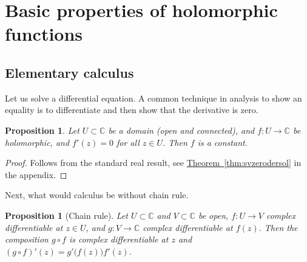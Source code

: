 \documentclass[12pt,openany]{book}
\newcommand{\C}{{\mathbb{C}}}
\theoremstyle{plain}
\newtheorem{prop}[thm]{Proposition}
\theoremstyle{remark}
\theoremstyle{definition}
\theoremstyle{exercise}
\theoremstyle{example}
\newcommand{\thmref}[1]{\hyperref[#1]{Theorem~\ref*{#1}}}
\begin{document}

\section{Basic properties of holomorphic functions}

\subsection{Elementary calculus}

Let us solve a differential equation.  A common technique in analysis
to show an equality is to differentiate and then show that the derivative is
zero.

\begin{prop} \label{prop:zeroder}
Let $U \subset \C$ be a domain (open and connected),
and $f \colon U \to \C$ be holomorphic, and $f'(z) = 0$ for all $z \in U$.
Then $f$ is a constant.
\end{prop}

\begin{proof}
Follows from the standard real result,
see \thmref{thm:svzerodersol} in the appendix.
\end{proof}

Next, what would calculus be without chain rule.

\begin{prop}[Chain rule] 
Let $U \subset \C$ and $V \subset \C$ be open, $f \colon U \to V$
complex differentiable at $z \in U$, and $g \colon V \to \C$ complex differentiable
at $f(z)$.  Then the composition $g \circ f$
is complex differentiable at $z$ and $(g \circ f)'(z) = g'\bigl(f(z)\bigr) f'(z)$.
\end{prop}
\end{document}
